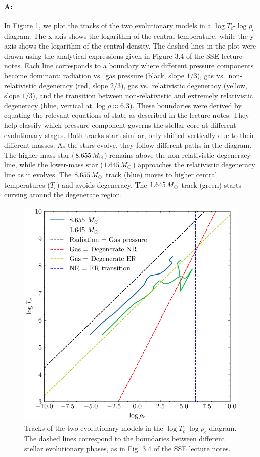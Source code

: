 \documentclass[twocolumn,fontsize=11pt]{scrartcl}
\begin{document}
\paragraph{A:} In Figure \ref{fig:q24_deg}, we plot the tracks of the two evolutionary models in a \(\log T_c\)-\(\log \rho_c\) diagram. The x-axis shows the logarithm of the central temperature, while the y-axis shows the logarithm of the central density. The dashed lines in the plot were drawn using the analytical expressions given in Figure 3.4 of the SSE lecture notes. Each line corresponds to a boundary where different pressure components become dominant: radiation vs.\ gas pressure (black, slope \(1/3\)), gas vs.\ non-relativistic degeneracy (red, slope \(2/3\)), gas vs.\ relativistic degeneracy (yellow, slope \(1/3\)), and the transition between non-relativistic and extremely relativistic degeneracy (blue, vertical at \(\log \rho \approx 6.3\)).  These boundaries were derived by equating the relevant equations of state as described in the lecture notes. They help classify which pressure component governs the stellar core at different evolutionary stages. Both tracks start similar, only shifted vertically due to their different masses. As the stars evolve, they follow different paths in the diagram. The higher-mass star (\(8.655\,M_\odot\)) remains above the non-relativistic degeneracy line, while the lower-mass star (\(1.645\,M_\odot\)) approaches the relativistic degeneracy line as it evolves.
The $8.655\,M_\odot$ track (blue) moves to higher central temperatures ($T_c$) and avoids degeneracy. The $1.645\,M_\odot$ track (green) starts curving around the degenerate region.

\begin{figure}[p]
    \centering
    \includegraphics{q24_deg.pdf}
    \caption{Tracks of the two evolutionary models in the \(\log T_c\)-\(\log \rho_c\) diagram. The dashed lines correspond to the boundaries between different stellar evolutionary phases, as in Fig. 3.4 of the SSE lecture notes.}
    \label{fig:q24_deg}
\end{figure}
\end{document}
